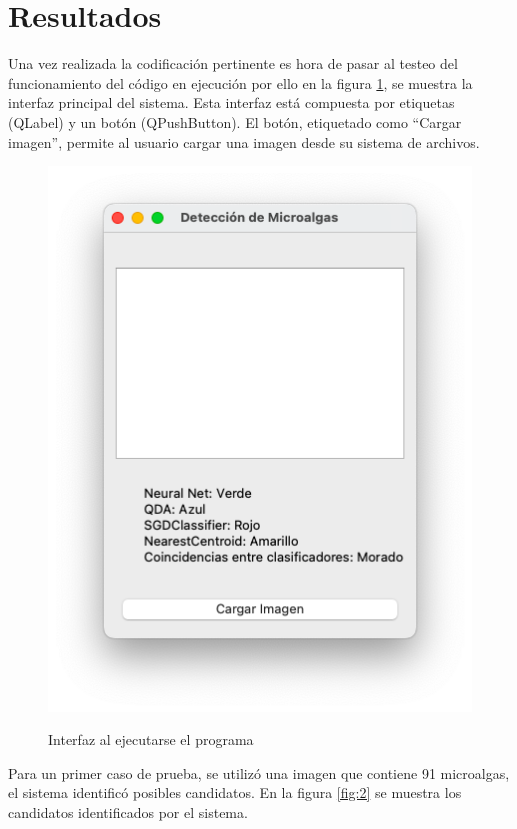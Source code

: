\documentclass[conference]{IEEEtran}
\begin{document}
\section{Resultados}
Una vez realizada la codificación pertinente es hora de pasar al testeo del funcionamiento del código en ejecución por ello en la figura \ref{fig:1}, se muestra la interfaz principal del sistema. Esta interfaz está compuesta por etiquetas (QLabel) y un botón (QPushButton). El botón, etiquetado como “Cargar imagen”, permite al usuario cargar una imagen desde su sistema de archivos.


\begin{figure}[h]
    \centering
    {\includegraphics[width=.85\linewidth]{img/pantallaprincipal.png}}
    \caption{Interfaz al ejecutarse el programa}
    \label{fig:1}
\end{figure}

Para un primer caso de prueba, se utilizó una imagen que contiene 91 microalgas,  el sistema identificó posibles candidatos. En la figura \ref{fig:2} se muestra los candidatos identificados por el sistema.
\end{document}
